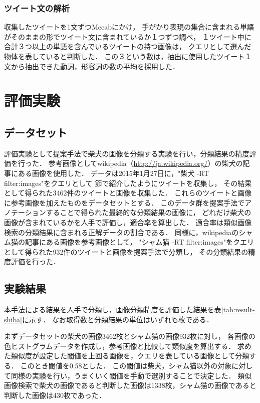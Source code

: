 \subsection{ツイート文の解析}

収集したツイートを1文ずつMecabにかけ，
手がかり表現の集合に含まれる単語がそのままの形でツイート文に含まれているか１つずつ調べ，
１ツイート中に合計３つ以上の単語を含んでいるツイートの持つ画像は，
クエリとして選んだ物体を表していると判断した．
この３という数は，抽出に使用したツイート１文から抽出できた動詞，形容詞の数の平均を採用した．

\chapter{評価実験}
\label{sec:experiment}
\section{データセット}

評価実験として提案手法で柴犬の画像を分類する実験を行い，分類結果の精度評価を行った．
参考画像としてwikipedia（\url{http://ja.wikipedia.org/}）の柴犬の記事にある画像を使用した．
データは2015年1月27日に，"柴犬 -RT filter:images"をクエリとして
\label{sec:tweetCollect}節で紹介したようにツイートを収集し，
その結果として得られた3462件のツイートと画像を収集した．
これらのツイートと画像に参考画像を加えたものをデータセットとする．
このデータ群を提案手法でアノテーションすることで得られた最終的な分類結果の画像に，
どれだけ柴犬の画像が含まれているかを人手で評価し，適合率を算出した．
適合率は類似画像検索の分類結果に含まれる正解データの割合である．
同様に，wikipediaのシャム猫の記事にある画像を参考画像として，
"シャム猫 -RT filter:images"をクエリとして得られた932件のツイートと画像を提案手法で分類し，
その分類結果の精度評価を行った．

\section{実験結果}
\label{sec:expresult}

本手法による結果を人手で分類し，画像分類精度を評価した結果を表\ref{tab:result-shiba}に示す．
なお取得数と分類結果の単位はいずれも枚である．

まずデータセットの柴犬の画像3462枚とシャム猫の画像932枚に対し，
各画像の色ヒストグラムデータを作成し，参考画像と比較して類似度を算出する．
求めた類似度が設定した閾値を上回る画像を，クエリを表している画像として分類する．
このとき閾値を0.58とした．
この閾値は柴犬，シャム猫以外の対象に対して同様の実験を行い，うまくいく閾値を手動で選別することで決定した．
類似画像検索で柴犬の画像であると判断した画像は1338枚，シャム猫の画像であると判断した画像は430枚であった．


